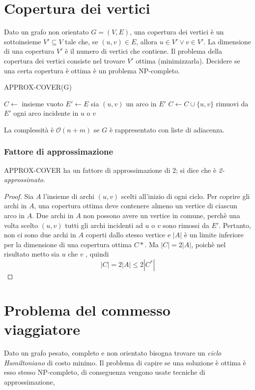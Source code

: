 \documentclass[11pt]{book}
\begin{document}
\section{Copertura dei vertici}
Dato un grafo non orientato $G=(V,E)$, una copertura dei vertici è un sottoinsieme $V'\subseteq V$ tale che, se $(u,v)\in E$, 
allora $u\in V'\vee v\in V'$.
La dimensione di una copertura $V'$ è il numero di vertici che contiene. Il problema della copertura dei vertici consiste 
nel trovare $V'$ ottima (minimizzarla). Decidere se una certa copertura è ottima è un problema NP-completo.
\begin{algorithm}[H]
    \caption{APPROX-COVER(G)}
    \begin{algorithmic}
        \State $C\gets$ insieme vuoto
        \State $E'\gets E$
            \State sia $(u,v)$ un arco in $E'$
            \State $C\gets C\cup\{u,v\}$
            \State rimuovi da $E'$ ogni arco incidente in $u$ o $v$
        \EndWhile\\
    \end{algorithmic}
\end{algorithm}
La complessità è $\mathcal{O}(n+m)$ se $G$ è rappresentato con liste di adiacenza.
\subsubsection{Fattore di approssimazione}
APPROX-COVER ha un fattore di approssimazione di 2; si dice che è \textit{2-approssimato}.
\begin{proof}
    Sia $A$ l'insieme di archi $(u,v)$ scelti all'inizio di ogni ciclo. Per coprire gli archi in $A$, una copertura ottima 
    deve contenere almeno un vertice di ciascun arco in $A$. Due archi in $A$ non possono avere un vertice in comune, 
    perchè una volta scelto $(u,v)$ tutti gli archi incidenti ad $u$ o $v$ sono rimossi da $E'$. Pertanto, non ci sono 
    due archi in $A$ coperti dallo stesso vertice e $|A|$ è un limite inferiore per la dimensione di una copertura ottima 
    $C*$. Ma $|C|=2|A|$, poichè nel risultato metto sia $u$ che $v$ , quindi 
    \begin{equation*}
        |C|=2|A|\leq 2|C^*|
    \end{equation*}
\end{proof}
\section{Problema del commesso viaggiatore}
Dato un grafo pesato, completo e non orientato bisogna trovare un \textit{ciclo Hamiltoniano} di costo minimo. Il problema 
di capire se una soluzione è ottima è esso stesso NP-completo, di conseguenza vengono usate tecniche di approssimazione,
\end{document}
